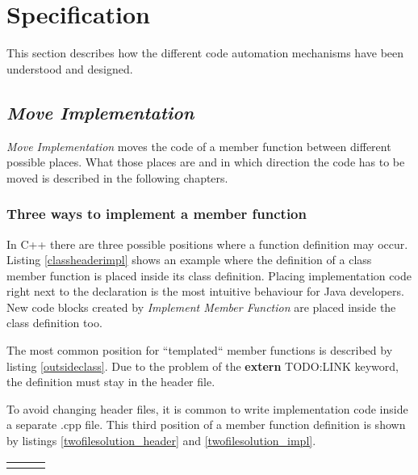 \chapter{Specification}
\thispagestyle{fancy}

This section describes how the different code automation mechanisms have been
understood and designed.

\section{\textit{Move Implementation}}

\textit{Move Implementation} moves the code of a member function between
different possible places. What those places are and in which direction the code
has to be moved is described in the following chapters. 

\subsection{Three ways to implement a member function}

In C++ there are three possible positions where a 
function definition may occur. Listing \ref{classheaderimpl} shows an example
where the definition of a class member function is placed inside its class
definition. Placing implementation code right next to the declaration is the
most intuitive behaviour for Java developers. New code blocks created by
\textit{Implement Member Function} are placed inside the class definition too.



The most common position  for ``templated``
member functions is described by listing \ref{outsideclass}. Due to the problem
of the \textbf{extern} TODO:LINK keyword, the definition must stay in the header
file.



To avoid changing header files,  it is common to
write implementation code inside a separate .cpp file. This third position of a
member function definition is shown by listings \ref{twofilesolution_header} and
\ref{twofilesolution_impl}.

\begin{tabular}{p{5cm}p{.4cm}p{5cm}}

& & 

\end{tabular}

